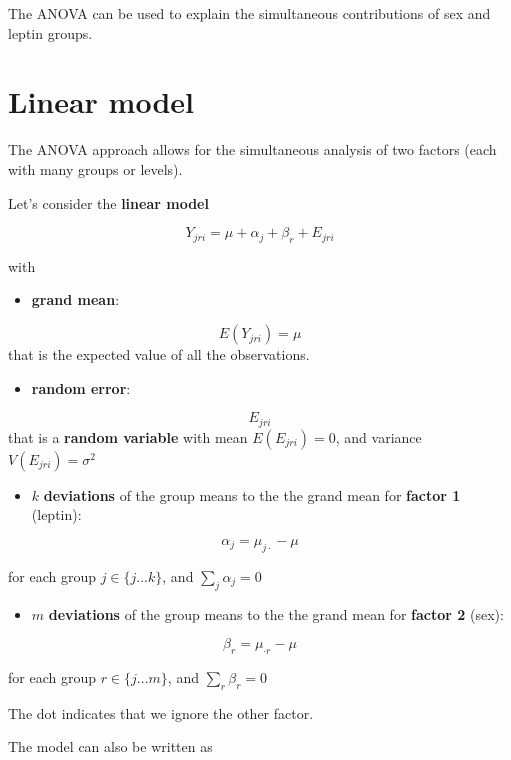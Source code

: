 \documentclass[
]{book}
\providecommand{\tightlist}{%
  \setlength{\itemsep}{0pt}\setlength{\parskip}{0pt}}
\begin{document}
The ANOVA can be used to explain the simultaneous contributions of sex and leptin groups.

\hypertarget{linear-model-1}{%
\section{Linear model}\label{linear-model-1}}

The ANOVA approach allows for the simultaneous analysis of two factors (each with many groups or levels).

Let's consider the \textbf{linear model}

\[Y_{jri} = \mu + \alpha_j + \beta_r + E_{jri}\]

with

\begin{itemize}
\tightlist
\item
  \textbf{grand mean}:
\end{itemize}

\[E(Y_{jri})=\mu\]
that is the expected value of all the observations.

\begin{itemize}
\tightlist
\item
  \textbf{random error}:
\end{itemize}

\[E_{jri}\] that is a \textbf{random variable} with mean \(E(E_{jri})=0\), and variance \(V(E_{jri})=\sigma^2\)

\begin{itemize}
\tightlist
\item
  \(k\) \textbf{deviations} of the group means to the the grand mean for \textbf{factor 1} (leptin):
\end{itemize}

\[\alpha_j=\mu_{j\cdot}-\mu\]

for each group \(j \in\{j...k\}\), and \(\sum_j \alpha_j=0\)

\begin{itemize}
\tightlist
\item
  \(m\) \textbf{deviations} of the group means to the the grand mean for \textbf{factor 2} (sex):
\end{itemize}

\[\beta_r=\mu_{\cdot r}-\mu\]

for each group \(r \in\{j...m\}\), and \(\sum_r \beta_r=0\)

The dot indicates that we ignore the other factor.

The model can also be written as
\end{document}
